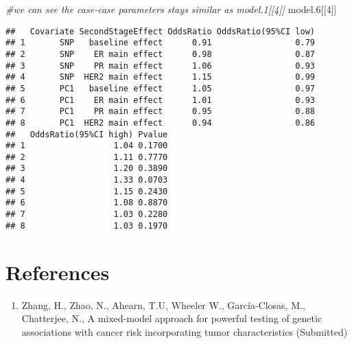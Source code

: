 \documentclass[11pt,]{article}
\newenvironment{Shaded}{\begin{snugshade}}{\end{snugshade}}
\newcommand{\CommentTok}[1]{\textcolor[rgb]{0.56,0.35,0.01}{\textit{#1}}}
\newcommand{\DecValTok}[1]{\textcolor[rgb]{0.00,0.00,0.81}{#1}}
\newcommand{\FloatTok}[1]{\textcolor[rgb]{0.00,0.00,0.81}{#1}}
\newcommand{\NormalTok}[1]{#1}
\providecommand{\tightlist}{%
\setlength{\itemsep}{0pt}\setlength{\parskip}{0pt}}
\begin{document}
\begin{Shaded}
\begin{Highlighting}[]
\CommentTok{#we can see the case-case parameters stays similar as model.1[[4]]}
\NormalTok{model}\FloatTok{.6}\NormalTok{[[}\DecValTok{4}\NormalTok{]]}
\end{Highlighting}
\end{Shaded}

\begin{verbatim}
##   Covariate SecondStageEffect OddsRatio OddsRatio(95%CI low)
## 1       SNP   baseline effect      0.91                 0.79
## 2       SNP    ER main effect      0.98                 0.87
## 3       SNP    PR main effect      1.06                 0.93
## 4       SNP  HER2 main effect      1.15                 0.99
## 5       PC1   baseline effect      1.05                 0.97
## 6       PC1    ER main effect      1.01                 0.93
## 7       PC1    PR main effect      0.95                 0.88
## 8       PC1  HER2 main effect      0.94                 0.86
##   OddsRatio(95%CI high) Pvalue
## 1                  1.04 0.1700
## 2                  1.11 0.7770
## 3                  1.20 0.3890
## 4                  1.33 0.0703
## 5                  1.15 0.2430
## 6                  1.08 0.8870
## 7                  1.03 0.2280
## 8                  1.03 0.1970
\end{verbatim}

\hypertarget{references}{%
\section{References}\label{references}}

\begin{enumerate}
\def\labelenumi{\arabic{enumi}.}
\tightlist
\item
  Zhang, H., Zhao, N., Ahearn, T.U, Wheeler W., García-Closas, M.,
  Chatterjee, N., A mixed-model approach for powerful testing of genetic
  associations with cancer risk incorporating tumor characteristics
  (Submitted)
\end{enumerate}




\newpage
\singlespacing 
\end{document}

